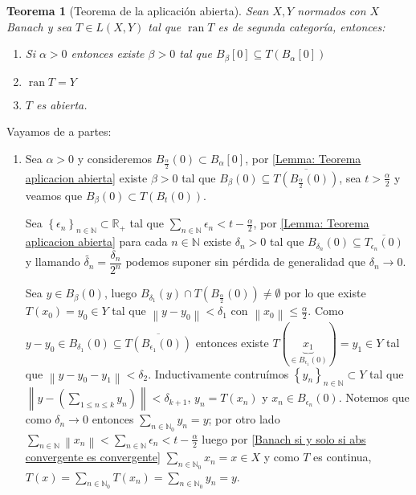 \documentclass[11pt]{article}
\newcommand{\R}{{\mathbb{R}}}
\newcommand{\N}{{\mathbb{N}}}
\newcommand{\norm}[1]{\left\lVert#1\right\rVert}
\newcommand{\sett}[1]{\left\lbrace#1\right\rbrace}
\newcommand{\Bigsum}[2]{\sum\limits_{#1}{#2}}
\DeclareMathOperator{\rank}{ran}
\newtheorem{theorem}{Teorema}
\numberwithin{theorem}{subsection}
\newenvironment{proof}[1][Demostraci\'on]{\begin{trivlist}
		\item[\hskip \labelsep {\bfseries #1}]}{\end{trivlist}}
\begin{document}
\begin{theorem}[Teorema de la aplicaci\'on abierta]
	\label{Teorema de la aplicacion abierta}
	Sean $X,Y$ normados con $X$ Banach y sea $T \in L(X,Y)$ tal que $\rank T$ es de segunda categor\'ia, entonces:
	
	\begin{enumerate}
		\item Si $\alpha > 0 $ entonces existe $\beta > 0$ tal que $B_{\beta}[0] \subseteq T(B_{\alpha}[0])$
		\item $\rank T = Y$
		\item $T$ es abierta.
	\end{enumerate}
	
\end{theorem}

\begin{proof}
	Vayamos de a partes:
	
	\begin{enumerate}
		
		\item Sea $\alpha > 0$ y consideremos $B_{\frac{\alpha}{2}}(0) \subset B_{\alpha}[0]$, por \ref{Lemma: Teorema aplicacion abierta} existe $\beta > 0$ tal que $B_{\beta}(0) \subseteq \overline{T(B_{\frac{\alpha}{2}}(0))}$, sea $t > \frac{\alpha}{2}$ y veamos que $B_{\beta}(0) \subset T \left(B_{t}(0)\right)$.
		
		Sea $\sett{\epsilon_n}_{n \in \N} \subset \R_{+}$ tal que $\Bigsum{n \in \N}{\epsilon_n} < t - \frac{\alpha}{2}$, por \ref{Lemma: Teorema aplicacion abierta} para cada $n \in \N$ existe $\delta_n > 0$ tal que $B_{\delta_n}(0) \subseteq \overline{T_{\epsilon_n}(0)}$ y llamando $\tilde{\delta_n} = \dfrac{\delta_n}{2^{n}}$ podemos suponer sin p\'erdida de generalidad que $\delta_n \rightarrow 0$.
		
		Sea $y \in B_{\beta}(0)$, luego $B_{\delta_1}(y) \cap T \left(B_{\frac{\alpha}{2}}(0)\right) \neq \emptyset$ por lo que existe $T(x_0) = y_0 \in Y$ tal que $\norm{y - y_0} < \delta_1$ con $\norm{x_0} \leq \frac{\alpha}{2}$. Como $y-y_0 \in B_{\delta_1}(0) \subseteq \overline{T \left(B_{\epsilon_1}(0)\right)}$ entonces existe $T(\underbrace{x_1}_{\in B_{\epsilon_1}(0)})=y_1 \in Y$ tal que $\norm{y-y_0-y_1} < \delta_2$. Inductivamente contru\'imos $\sett{y_n}_{n \in \N} \subset Y$ tal que $\norm{y- \left(\Bigsum{1 \leq n \leq k}{y_n}\right)} < \delta_{k+1}$, $y_n = T(x_n)$ y $x_n \in B_{\epsilon_n}(0)$. Notemos que como $\delta_n \rightarrow 0$ entonces $\Bigsum{n \in \N_0}{y_n} = y$; por otro lado $\Bigsum{n \in \N}{\norm{x_n}} < \Bigsum{n \in \N}{\epsilon_n} < t-\frac{\alpha}{2}$ luego por \ref{Banach si y solo si abs convergente es convergente} $\Bigsum{n \in \N_0}{x_n} = x \in X$ y como $T$ es continua, $T(x) = \Bigsum{n \in \N_0}{T(x_n)} = \Bigsum{n \in \N_0}{y_n} = y$.
		

\end{enumerate}
\end{proof}
\end{document}
